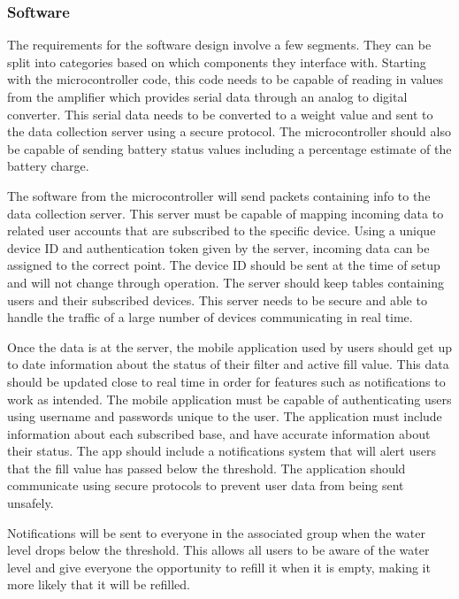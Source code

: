 \subsubsection{Software}

The requirements for the software design involve a few segments. They can be split into categories based on which components they interface with. Starting with the microcontroller code, this code needs to be capable of reading in values from the amplifier which provides serial data through an analog to digital converter. This serial data needs to be converted to a weight value and sent to the data collection server using a secure protocol. The microcontroller should also be capable of sending battery status values including a percentage estimate of the battery charge. 

The software from the microcontroller will send packets containing info to the data collection server. This server must be capable of mapping incoming data to related user accounts that are subscribed to the specific device. Using a unique device ID and authentication token given by the server, incoming data can be assigned to the correct point. The device ID should be sent at the time of setup and will not change through operation. The server should keep tables containing users and their subscribed devices. This server needs to be secure and able to handle the traffic of a large number of devices communicating in real time. 

Once the data is at the server, the mobile application used by users should get up to date information about the status of their filter and active fill value. This data should be updated close to real time in order for features such as notifications to work as intended. The mobile application must be capable of authenticating users using username and passwords unique to the user. The application must include information about each subscribed base, and have accurate information about their status. The app should include a notifications system that will alert users that the fill value has passed below the threshold. The application should communicate using secure protocols to prevent user data from being sent unsafely. 

Notifications will be sent to everyone in the associated group when the water level drops below the threshold. This allows all users to be aware of the water level and give everyone the opportunity to refill it when it is empty, making it more likely that it will be refilled. 